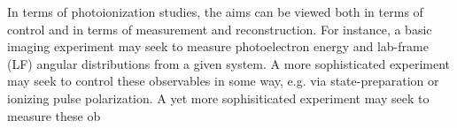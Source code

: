 In terms of photoionization studies, the aims can be viewed both in terms of control and in terms of measurement and reconstruction. For instance, a basic imaging experiment may seek to measure photoelectron energy and lab-frame (LF) angular distributions from a given system. A more sophisticated experiment may seek to control these observables in some way, e.g. via state-preparation or ionizing pulse polarization. A yet more sophisiticated experiment may seek to measure these ob